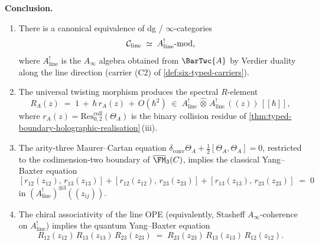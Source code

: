 \begin{theorem}
\noindent\textbf{Conclusion.}\enspace
\begin{enumerate}[label=\textup{(\alph*)}]
\item There is a canonical equivalence of dg / $\infty$-categories
\begin{equation}\label{eq:line-as-Akoszul-mod}
 \mathcal C_{\mathrm{line}}
 \;\simeq\;
 A^{!}_{\mathrm{line}}\text{-}\mathrm{mod},
\end{equation}
where $A^{!}_{\mathrm{line}}$ is the $A_{\infty}$ algebra obtained from
$\BarTwc{A}$ by Verdier duality along the line direction (carrier
\textup{(C2)} of \cref{def:six-typed-carriers}).
\item The universal twisting morphism produces the spectral
$R$-element
\begin{equation}\label{eq:spectral-R-from-tau}
 R_{A}(z) \;=\; 1 \,+\, \hbar\,r_{A}(z) \,+\, O(\hbar^{2})
 \;\in\;
 A^{!}_{\mathrm{line}} \,\widehat{\otimes}\, A^{!}_{\mathrm{line}}
 \,(\!(z)\!)\,[\![\hbar]\!],
\end{equation}
where $r_{A}(z) = \mathrm{Res}^{\mathrm{coll}}_{0,2}(\Theta_{A})$ is the
binary collision residue of
\cref{thm:typed-boundary-holographic-realisation}\,(iii).
\item The arity-three Maurer--Cartan equation
$\delta_{\mathrm{conv}}\Theta_{A} +
\tfrac{1}{2}[\Theta_{A}, \Theta_{A}] = 0$, restricted to the
codimension-two boundary of $\overline{\FM}_{3}(C)$, implies the
classical Yang--Baxter equation
\begin{equation}\label{eq:CYBE-from-MC-arity3}
 [r_{12}(z_{12}),\, r_{13}(z_{13})]
 + [r_{12}(z_{12}),\, r_{23}(z_{23})]
 + [r_{13}(z_{13}),\, r_{23}(z_{23})]
 \;=\; 0
\end{equation}
in $(A^{!}_{\mathrm{line}})^{\otimes 3}(\!(z_{ij})\!)$.
\item The chiral associativity of the line OPE \textup(equivalently,
Stasheff $A_{\infty}$-coherence on $A^{!}_{\mathrm{line}}$\textup)
implies the quantum Yang--Baxter equation
\begin{equation}\label{eq:QYBE-from-line-associativity}
 R_{12}(z_{12})\,R_{13}(z_{13})\,R_{23}(z_{23})
 \;=\;
 R_{23}(z_{23})\,R_{13}(z_{13})\,R_{12}(z_{12}).
\end{equation}
\end{enumerate}
\end{theorem}

